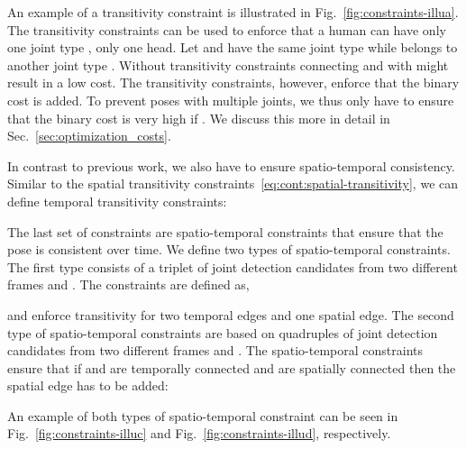 \documentclass[10pt,twocolumn,letterpaper]{article}
\begin{document}
An example of a transitivity constraint is illustrated in Fig.~\ref{fig:constraints-illua}. The transitivity constraints can be used to enforce that a human can have only one joint type , \eg only one head. Let  and  have the same joint type  while  belongs to another joint type . Without transitivity constraints connecting  and  with  
might result in a low cost. The transitivity constraints, however, enforce that the binary cost  is added. 
To prevent poses with multiple joints, we thus only have to ensure that the binary cost  is very high if . We discuss this more in detail in Sec.~\ref{sec:optimization_costs}. 

In contrast to previous work, we also have to ensure spatio-temporal consistency. Similar to the spatial transitivity constraints~\eqref{eq:cont:spatial-transitivity}, we can define temporal transitivity constraints:    


The last set of constraints are spatio-temporal constraints that ensure that the pose is consistent over time. We define two types of spatio-temporal constraints. The first type consists of a triplet of joint detection candidates  from two different frames  and . The constraints are defined as,

and enforce transitivity for two temporal edges and one spatial edge. 
The second type of spatio-temporal constraints are based on quadruples of joint detection candidates  from two different frames  and . The spatio-temporal constraints ensure that if  and  are temporally connected and  are spatially connected then the spatial edge  has to be added:  

An example of both types of spatio-temporal constraint can be seen in Fig.~\ref{fig:constraints-illuc} and Fig.~\ref{fig:constraints-illud}, respectively.
\end{document}
